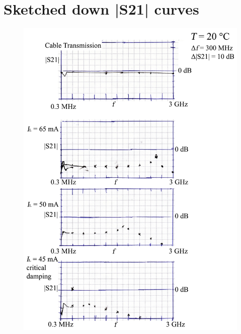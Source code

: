 \chapter{Sketched down |S21| curves}
\label{app:s21}
\begin{figure}[ht]
\includegraphics[width=\columnwidth]{Grafiken/S21.pdf}%
\caption{}%
\label{}%
\end{figure}